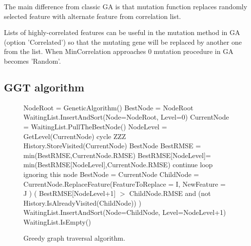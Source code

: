 \documentclass[aip,jcp,reprint,amsmath,amssymb,nature]{revtex4-1}
\begin{document}
The main difference from classic GA is that mutation function replaces randomly selected feature with alternate feature from correlation list. 

Lists of highly-correlated features can be useful in the mutation method in GA (option 'Correlated') so that the mutating gene will be replaced by another one from the list. When MinCorrelation approaches 0 mutation procedure in GA becomes 'Random'.

\subsection{GGT algorithm}



\begin{figure*}
   \begin{algorithmic}[1]
	\State NodeRoot = GeneticAlgorithm() 
	\State BestNode = NodeRoot
	\State WaitingList.InsertAndSort(Node=NodeRoot, Level=0) 
	\Repeat
		\State CurrentNode = WaitingList.PullTheBestNode() 
		\State NodeLevel = GetLevel(CurrentNode)
			\State cycle ZZZ 
		\EndIf
		\State History.StoreVisited(CurrentNode)
			\State \Return BestNode
		\EndIf 
		\State BestRMSE = min(BestRMSE,CurrentNode.RMSE)
		\State BestRMSE[NodeLevel]= min(BestRMSE[NodeLevel],CurrentNode.RMSE)
			\State continue loop ignoring this node
		\Else
			\State BestNode = CurrentNode
		\EndIf
			 
				\State ChildNode = CurrentNode.ReplaceFeature(FeatureToReplace = I, NewFeature = J )
				\If ( BestRMSE[NodeLevel+1] $>$ ChildNode.RMSE and (not History.IsAlreadyVisited(ChildNode)) )
					\State WaitingList.InsertAndSort(Node=ChildNode, Level=NodeLevel+1)
				\EndIf
			\EndFor
		\EndFor
	\Until WaitingList.IsEmpty()
   \end{algorithmic}
\caption{\label{fig:ggta} Greedy graph traversal algorithm.}
\end{figure*}
\end{document}
